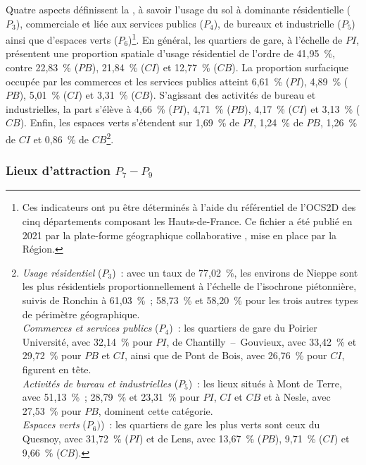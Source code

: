 \begin{refsegment}
Quatre aspects définissent la , à savoir l'usage du sol à dominante résidentielle (\(P_{3}\)), commerciale et liée aux services publics (\(P_{4}\)), de bureaux et industrielle (\(P_{5}\)) ainsi que d'espaces verts (\(P_{6}\))\footnote{
    Ces indicateurs ont pu être déterminés à l'aide du référentiel de l'\acrfull{OCS2D} des cinq départements composant les Hauts-de-France. Ce fichier a été publié en 2021 par la plate-forme géographique collaborative \textcolor{blue}{\textcite{geo2france_occupation_2021}}, mise en place par la Région.
}. En général, les quartiers de gare, à l'échelle de \(PI\), présentent une proportion spatiale d'usage résidentiel de l'ordre de 41,95~\%, contre 22,83~\% (\(PB\)), 21,84~\% (\(CI\)) et 12,77~\% (\(CB\)). La proportion surfacique occupée par les commerces et les services publics atteint 6,61~\% (\(PI\)), 4,89~\% (\(PB\)), 5,01~\% (\(CI\)) et 3,31~\% (\(CB\)). S'agissant des activités de bureau et industrielles, la part s'élève à 4,66~\% (\(PI\)), 4,71~\% (\(PB\)), 4,17~\% (\(CI\)) et 3,13~\% (\(CB\)). Enfin, les espaces verts s'étendent sur 1,69~\% de \(PI\), 1,24~\% de \(PB\), 1,26~\% de \(CI\) et 0,86~\% de \(CB\)\footnote{
    \textsl{Usage résidentiel} (\(P_{3}\))~: avec un taux de 77,02~\%, les environs de Nieppe sont les plus résidentiels proportionnellement à l'échelle de l'isochrone piétonnière, suivis de Ronchin à 61,03~\%~; 58,73~\% et 58,20~\% pour les trois autres types de périmètre géographique.
    \\
    \textsl{Commerces et services publics} (\(P_{4}\))~: les quartiers de gare du Poirier Université, avec 32,14~\% pour \(PI\), de Chantilly~–~Gouvieux, avec 33,42~\% et 29,72~\% pour \(PB\) et \(CI\), ainsi que de Pont de Bois, avec 26,76~\% pour \(CI\), figurent en tête.
    \\
    \textsl{Activités de bureau et industrielles} (\(P_{5}\))~: les lieux situés à Mont de Terre, avec 51,13~\%~; 28,79~\% et 23,31~\% pour \(PI\), \(CI\) et \(CB\) et à Nesle, avec 27,53~\% pour \(PB\), dominent cette catégorie.
    \\
    \textsl{Espaces verts} (\(P_{6})\))~: les quartiers de gare les plus verts sont ceux du Quesnoy, avec 31,72~\% (\(PI\)) et de Lens, avec 13,67~\% (\(PB\)), 9,71~\% (\(CI\)) et 9,66~\% (\(CB\)).
}.%

\subsubsection*{Lieux d'attraction \(P_{7} - P_{9}\)
    \label{chap6:indicateurs-place-pois}
    }


\end{refsegment}
